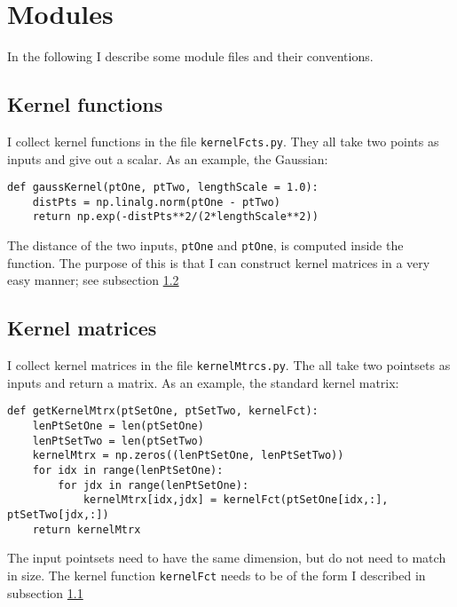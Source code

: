 \documentclass[12pt]{article}
\begin{document}
\section{Modules}

In the following I describe some module files and their conventions.



\subsection{Kernel functions}
	\label{subsec:kernelFcts}
I collect kernel functions in the file \texttt{kernelFcts.py}. They all take two points as inputs and give out a scalar. As an example, the Gaussian:
\begin{Verbatim}[formatcom=\color{blue!50!black}]
def gaussKernel(ptOne, ptTwo, lengthScale = 1.0):
    distPts = np.linalg.norm(ptOne - ptTwo)
    return np.exp(-distPts**2/(2*lengthScale**2))
\end{Verbatim}

The distance of the two inputs, \texttt{ptOne} and \texttt{ptOne}, is computed inside the function. The purpose of this is that I can construct kernel matrices in a very easy manner; see subsection \ref{subsec:kernelMtrcs}

\subsection{Kernel matrices}
\label{subsec:kernelMtrcs}
I collect kernel matrices in the file \texttt{kernelMtrcs.py}. The all take two pointsets as inputs and return a matrix. As an example, the standard kernel matrix: 
\begin{Verbatim}[formatcom=\color{blue!50!black}]
def getKernelMtrx(ptSetOne, ptSetTwo, kernelFct):
    lenPtSetOne = len(ptSetOne)
    lenPtSetTwo = len(ptSetTwo)
    kernelMtrx = np.zeros((lenPtSetOne, lenPtSetTwo))
    for idx in range(lenPtSetOne):
        for jdx in range(lenPtSetOne):
            kernelMtrx[idx,jdx] = kernelFct(ptSetOne[idx,:], ptSetTwo[jdx,:])
    return kernelMtrx
\end{Verbatim}

The input pointsets need to have the same dimension, but do not need to match in size. The kernel function \texttt{kernelFct} needs to be of the form I described in subsection \ref{subsec:kernelFcts}
\end{document}
